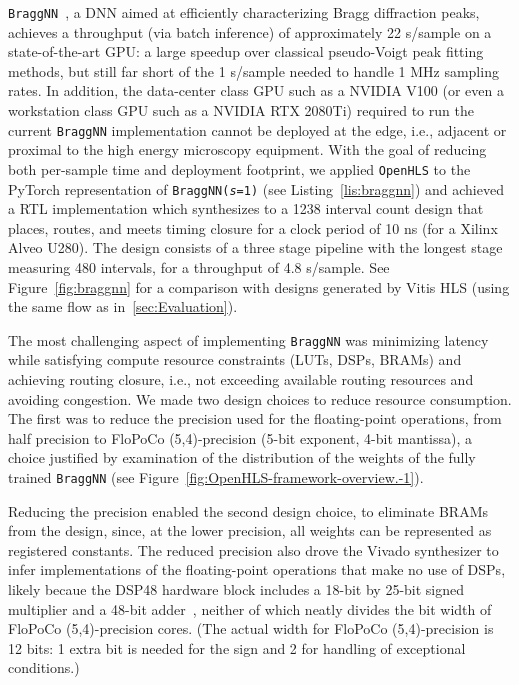 \documentclass[10pt]{sig-alternate}
\begin{document}
\texttt{BraggNN}~\cite{Liu:fs5198}, a DNN aimed at efficiently characterizing
Bragg diffraction peaks, achieves a throughput (via batch inference) of approximately 22
\textmu s/sample on a state-of-the-art GPU: a large speedup over classical pseudo-Voigt peak fitting methods, but still far
short of the 1 \textmu s/sample needed to handle 1 MHz sampling
rates. In addition, the
data-center class GPU such as a NVIDIA V100 (or even a workstation class GPU such as a NVIDIA RTX 2080Ti) required to run the current  \texttt{BraggNN} implementation cannot be
deployed at the edge, i.e., adjacent or
proximal to the high energy microscopy equipment. With the goal of reducing both per-sample time and deployment footprint,
we applied \texttt{OpenHLS} to the PyTorch representation of \texttt{BraggNN(\emph{s}=1)}\emph{
}(see Listing~\ref{lis:braggnn}) and achieved a RTL implementation
which synthesizes to a 1238 interval count design that places, routes,
and meets timing closure for a clock period of 10 ns (for a Xilinx
Alveo U280). The design consists of a three stage pipeline with the
longest stage measuring 480 intervals, for a throughput of 4.8 \textmu s/sample. See Figure~\ref{fig:braggnn} for a comparison with designs generated by Vitis HLS (using the same flow as in~\ref{sec:Evaluation}).

The most challenging aspect of implementing \texttt{BraggNN} was minimizing
latency while satisfying compute resource constraints (LUTs, DSPs,
BRAMs) and achieving routing closure, i.e., not exceeding available
routing resources and avoiding congestion. We made two design choices to reduce resource consumption. The first was to reduce the precision used for the floating-point operations,
from half precision to FloPoCo (5,4)-precision
(5-bit exponent, 4-bit mantissa), a choice justified
by examination of the distribution of the weights of the fully
trained \texttt{BraggNN} (see Figure~\ref{fig:OpenHLS-framework-overview.-1}).

Reducing the precision enabled the second design choice, to eliminate
BRAMs from the design, since, at the lower precision, all weights
can be represented as registered constants. The reduced precision
also drove the Vivado synthesizer to infer implementations of the
floating-point operations that make no use of DSPs,
likely becaue
the DSP48 hardware block includes a 18-bit by 25-bit signed multiplier
and a 48-bit adder~\cite{guideultrascale}, neither of which neatly
divides the bit width of FloPoCo (5,4)-precision cores.
(The actual width for FloPoCo (5,4)-precision is 12 bits: 1 extra bit is needed for the sign and 2 for handling of exceptional conditions.)
\end{document}
